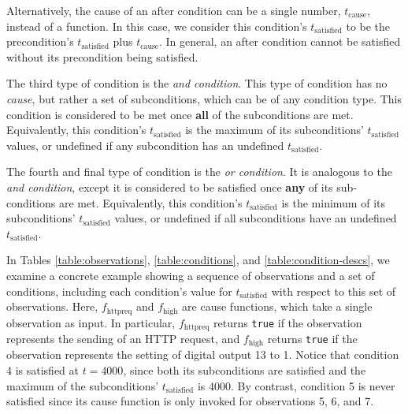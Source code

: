 \documentclass[12pt]{article}
\begin{document}
Alternatively, the cause of an after condition can be a single number, $t_{\text{cause}}$, instead of a function.  In this case, we consider this condition's $t_{\text{satisfied}}$ to be the precondition's $t_{\text{satisfied}}$ plus $t_{\text{cause}}$.  In general, an after condition cannot be satisfied without its precondition being satisfied.

The third type of condition is the \textit{and condition}.  This type of condition has no \textit{cause}, but rather a set of subconditions, which can be of any condition type.  This condition is considered to be met once \textbf{all} of the subconditions are met.  Equivalently, this condition's $t_{\text{satisfied}}$ is the maximum of its subconditions' $t_{\text{satisfied}}$ values, or undefined if any subcondition has an undefined $t_{\text{satisfied}}$.

The fourth and final type of condition is the \textit{or condition}.  It is analogous to the \textit{and condition}, except it is considered to be satisfied once \textbf{any} of its sub-conditions are met. Equivalently, this condition's $t_{\text{satisfied}}$ is the minimum of its subconditions' $t_{\text{satisfied}}$ values, or undefined if all subconditions have an undefined $t_{\text{satisfied}}$.

In Tables \ref{table:observations}, \ref{table:conditions}, and \ref{table:condition-descs}, we examine a concrete example showing a sequence of observations and a set of conditions, including each condition's value for $t_{\text{satisfied}}$ with respect to this set of observations.  Here, $f_{\text{httpreq}}$ and $f_{\text{high}}$ are cause functions, which take a single observation as input.  In particular, $f_{\text{httpreq}}$ returns \texttt{true} if the observation represents the sending of an HTTP request, and $f_{\text{high}}$ returns \texttt{true} if the observation represents the setting of digital output 13 to 1.  Notice that condition 4 is satisfied at $t=4000$, since both its subconditions are satisfied and the maximum of the subconditions' $t_{\text{satisfied}}$ is 4000.  By contrast, condition 5 is never satisfied since its cause function is only invoked for observations 5, 6, and 7.
\end{document}
